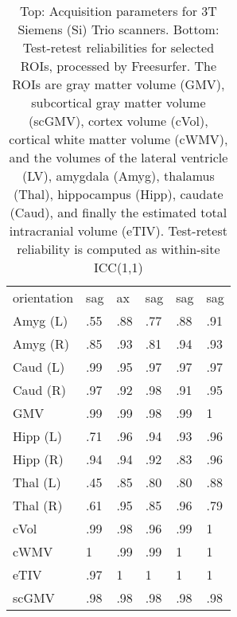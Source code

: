 \begin{table}
{\begin{tabular}{llllll}
orientation           &                sag &                 ax &                sag &                sag &                sag \\
Amyg (L)              &               .55 &               .88 &               .77 &               .88 &               .91 \\
Amyg (R)              &               .85 &               .93 &               .81 &               .94 &               .93 \\
Caud (L)              &               .99 &               .95 &               .97 &               .97 &               .97 \\
Caud (R)              &               .97 &               .92 &               .98 &               .91 &               .95 \\
GMV                   &               .99 &               .99 &               .98 &               .99 &               1   \\
Hipp (L)              &               .71 &               .96 &               .94 &               .93 &               .96 \\
Hipp (R)              &               .94 &               .94 &               .92 &               .83 &               .96 \\
Thal (L)              &               .45 &               .85 &               .80 &               .80 &               .88 \\
Thal (R)              &               .61 &               .95 &               .85 &               .96 &               .79 \\
cVol                  &               .99 &               .98 &               .96 &               .99 &               1   \\
cWMV                  &               1   &               .99 &               .99 &               1   &               1   \\
eTIV                  &               .97 &               1   &               1   &               1   &               1   \\
scGMV                 &               .98 &               .98 &               .98 &               .98 &               .98 \\
\bottomrule
\end{tabular}}
\fi
\caption{Top: Acquisition parameters for 3T Siemens (Si) Trio scanners. Bottom: Test-retest reliabilities for selected ROIs, processed by Freesurfer. The ROIs are gray matter volume (GMV), subcortical gray matter volume (scGMV), cortex volume (cVol), cortical white matter volume (cWMV), and the volumes of the lateral ventricle (LV), amygdala (Amyg), thalamus (Thal), hippocampus (Hipp), caudate (Caud), and finally the estimated total intracranial volume (eTIV). Test-retest reliability is computed as within-site ICC(1,1)} 
\label{tab:acquisition4}

\end{table}